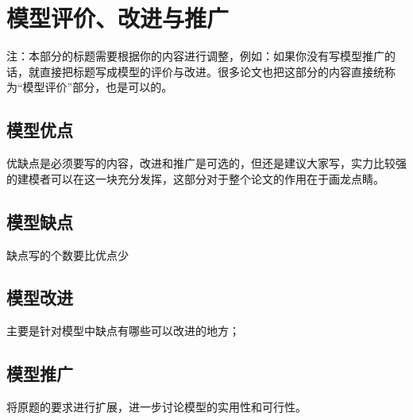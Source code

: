 \section{模型评价、改进与推广}
注：本部分的标题需要根据你的内容进行调整，例如：如果你没有写模型推广的话，就直接把标题写成模型的评价与改进。很多论文也把这部分的内容直接统称为“模型评价”部分，也是可以的。
\subsection{模型优点}
优缺点是必须要写的内容，改进和推广是可选的，但还是建议大家写，实力比较强的建模者可以在这一块充分发挥，这部分对于整个论文的作用在于画龙点睛。
\subsection{模型缺点}
缺点写的个数要比优点少
\subsection{模型改进}
主要是针对模型中缺点有哪些可以改进的地方；
\subsection{模型推广}
将原题的要求进行扩展，进一步讨论模型的实用性和可行性。








